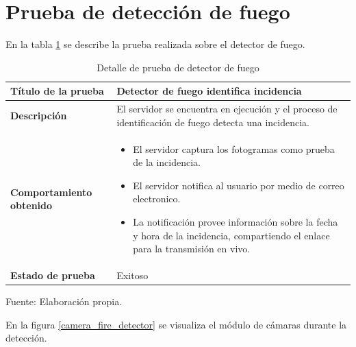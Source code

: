 \section{Prueba de detección de fuego}

En la tabla \ref{table_fire_detection} se describe la prueba realizada sobre el detector de fuego.\\

\begin{table}[H]
    \caption{Detalle de prueba de detector de fuego}
    \begin{center}
        \begin{tabular}{|>{\centering}p{}|m{}<{\centering}|} 
            \hline
            \textbf{Título de la prueba} & \textbf{Detector de fuego identifica incidencia} \\
            \hline
            \textbf{Descripción} & El servidor se encuentra en ejecución y el proceso de identificación de fuego detecta una incidencia.\\
            \hline
            \textbf{Comportamiento obtenido} & 
            \begin{itemize}
                \item El servidor captura los fotogramas como prueba de la incidencia.
                \item El servidor notifica al usuario por medio de correo electronico.
                \item La notificación provee información sobre la fecha y hora de la incidencia, compartiendo el enlace para la transmisión en vivo.
            \end{itemize} \\ 
            \hline
            \textbf{Estado de prueba} & Exitoso \\
            \hline
        \end{tabular}
    \end{center}
    \begin{center}
        Fuente: Elaboración propia.
        \label{table_fire_detection}
    \end{center}
\end{table}

En la figura \ref{camera_fire_detector} se visualiza el módulo de cámaras durante la detección.


